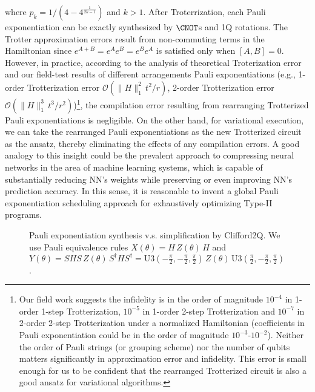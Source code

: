 where $p_k = 1 / ( 4 - 4^\frac{1}{2k-1})$ and $k > 1$. After Troterrization, each Pauli exponentiation can be exactly synthesized by $\CNOT$s and 1Q rotations. The Trotter approximation errors result from non-commuting terms in the Hamiltonian since $ e^{A+B} = e^{A} e^{B} = e^{B} e^{A} $ is satisfied only when $[A,B]=0$. However, in practice, according to the analysis of theoretical Troterization error~\cite{dalzell2023quantum} and our field-test results of different arrangements Pauli exponentiations (e.g., 1-order Trotterization error $\mathcal{O} ( \lVert H\rVert_1^2 \, t^2 / r )$, 2-order Trotterization error $\mathcal{O} ( \lVert H\rVert_1^3 \, t^3 / r^2 )$)\footnote{Our field work suggests the infidelity is in the order of magnitude $10^{-4}$ in 1-order 1-step Trotterization, $10^{-5}$ in 1-order 2-step Trotterization and $10^{-7}$ in 2-order 2-step Trotterization under a normalized Hamiltonian (coefficients in Pauli exponentiation could be in the order of magnitude $10^{-3}$-$10^{-2}$). Neither the order of Pauli strings (or grouping scheme) nor the number of qubits matters significantly in approximation error and infidelity. This error is small enough for us to be confident that the rearranged Trotterized circuit is also a good ansatz for variational algorithms.}, the compilation error resulting from rearranging Trotterized Pauli exponentiations is negligible. On the other hand, for variational execution, we can take the rearranged Pauli exponentiations as the new Trotterized circuit as the ansatz, thereby eliminating the effects of any compilation errors. A good analogy to this insight could be the prevalent  approach to compressing neural networks in the area of machine learning systems, which is capable of substantially reducing NN's weights while preserving or even improving NN's prediction accuracy. In this sense, it is reasonable to invent a global Pauli exponentiation scheduling approach for exhaustively optimizing Type-II programs.


\begin{figure}[tbp]
    \centering
        
    \vspace{0.2cm}
        
    \caption{Pauli exponentiation synthesis v.s. simplification by Clifford2Q. We use Pauli equivalence rules $X(\theta) = H\, Z(\theta)\, H$ and $Y(\theta) = SHS\, Z(\theta)\, S^\dagger H S^\dagger = \mathrm{U}3(-\frac{\pi}{2},-\frac{\pi}{2},\frac{\pi}{2})\, Z(\theta)\, \mathrm{U}3(\frac{\pi}{2}, -\frac{\pi}{2}, \frac{\pi}{2})$. }
    \label{fig:xxx-xyy-simp}
\end{figure}


